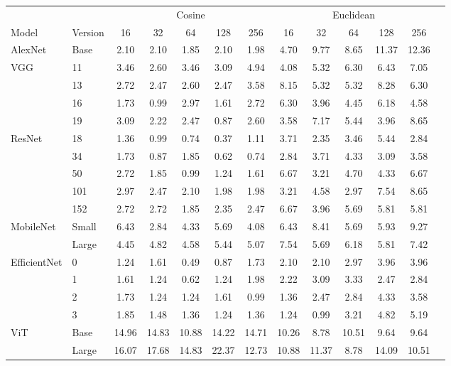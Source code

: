 \begin{table}[ht]
\centering
\setlength{\tabcolsep}{4pt}
\begin{tabular}{llccccc|cccccc}
\toprule
& & \multicolumn{5}{c}{Cosine} & \multicolumn{5}{c}{Euclidean} \\
\cmidrule(lr){3-7} \cmidrule(lr){8-12}
Model & Version & 16 & 32 & 64 & 128 & 256 & 16 & 32 & 64 & 128 & 256 \\
\midrule
AlexNet                 & Base  & 2.10 & 2.10 & 1.85 & 2.10 & 1.98 & 4.70 & 9.77 & 8.65 & 11.37 & 12.36 \\
\midrule
\multirow{4}{*}{VGG}    & 11    & 3.46 & 2.60 & 3.46 & 3.09 & 4.94 & 4.08 & 5.32 & 6.30 & 6.43 & 7.05 \\
                        & 13    & 2.72 & 2.47 & 2.60 & 2.47 & 3.58 & 8.15 & 5.32 & 5.32 & 8.28 & 6.30 \\
                        & 16    & 1.73 & 0.99 & 2.97 & 1.61 & 2.72 & 6.30 & 3.96 & 4.45 & 6.18 & 4.58 \\
                        & 19    & 3.09 & 2.22 & 2.47 & 0.87 & 2.60 & 3.58 & 7.17 & 5.44 & 3.96 & 8.65 \\
\midrule
\multirow{5}{*}{ResNet} & 18    & 1.36 & 0.99 & 0.74 & 0.37 & 1.11 & 3.71 & 2.35 & 3.46 & 5.44 & 2.84 \\
                        & 34    & 1.73 & 0.87 & 1.85 & 0.62 & 0.74 & 2.84 & 3.71 & 4.33 & 3.09 & 3.58 \\
                        & 50    & 2.72 & 1.85 & 0.99 & 1.24 & 1.61 & 6.67 & 3.21 & 4.70 & 4.33 & 6.67 \\
                        & 101   & 2.97 & 2.47 & 2.10 & 1.98 & 1.98 & 3.21 & 4.58 & 2.97 & 7.54 & 8.65 \\
                        & 152   & 2.72 & 2.72 & 1.85 & 2.35 & 2.47 & 6.67 & 3.96 & 5.69 & 5.81 & 5.81 \\
\midrule
\multirow{2}{*}{MobileNet} & Small & 6.43 & 2.84 & 4.33 & 5.69 & 4.08 & 6.43 & 8.41 & 5.69 & 5.93 & 9.27 \\
                           & Large & 4.45 & 4.82 & 4.58 & 5.44 & 5.07 & 7.54 & 5.69 & 6.18 & 5.81 & 7.42 \\
\midrule
\multirow{4}{*}{EfficientNet} & 0  & 1.24 & 1.61 & 0.49 & 0.87 & 1.73 & 2.10 & 2.10 & 2.97 & 3.96 & 3.96 \\
                              & 1  & 1.61 & 1.24 & 0.62 & 1.24 & 1.98 & 2.22 & 3.09 & 3.33 & 2.47 & 2.84 \\
                              & 2  & 1.73 & 1.24 & 1.24 & 1.61 & 0.99 & 1.36 & 2.47 & 2.84 & 4.33 & 3.58 \\
                              & 3  & 1.85 & 1.48 & 1.36 & 1.24 & 1.36 & 1.24 & 0.99 & 3.21 & 4.82 & 5.19 \\
\midrule
\multirow{2}{*}{ViT}    & Base  & 14.96 & 14.83 & 10.88 & 14.22 & 14.71 & 10.26 & 8.78 & 10.51 & 9.64 & 9.64 \\
                        & Large & 16.07 & 17.68 & 14.83 & 22.37 & 12.73 & 10.88 & 11.37 & 8.78 & 14.09 & 10.51 \\
\bottomrule
\end{tabular}
\end{table}

